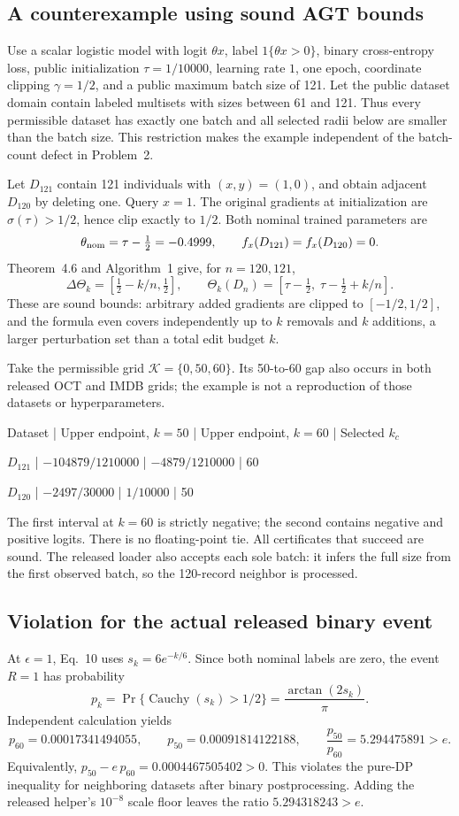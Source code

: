 \documentclass[10pt]{article}
\begin{document}
\subsection*{A counterexample using sound AGT bounds}
Use a scalar logistic model with logit \(\theta x\), label \(1\{\theta x>0\}\), binary cross-entropy loss, public initialization \(\tau=1/10000\), learning rate \(1\), one epoch, coordinate clipping \(\gamma=1/2\), and a public maximum batch size of 121. Let the public dataset domain contain labeled multisets with sizes between 61 and 121. Thus every permissible dataset has exactly one batch and all selected radii below are smaller than the batch size. This restriction makes the example independent of the batch-count defect in Problem 2.\par
Let \(D_{121}\) contain 121 individuals with \((x,y)=(1,0)\), and obtain adjacent \(D_{120}\) by deleting one. Query \(x=1\). The original gradients at initialization are \(\sigma(\tau)>1/2\), hence clip exactly to \(1/2\). Both nominal trained parameters are \[\theta_{\rm nom}=\tau-\tfrac12=-0.4999,\qquad f_x(D_{121})=f_x(D_{120})=0.\] Theorem 4.6 and Algorithm 1 give, for \(n=120,121\), \[\Delta\Theta_k=[\tfrac12-k/n,\tfrac12],
 \qquad
 \Theta_k(D_n)=[\tau-\tfrac12,\;\tau-\tfrac12+k/n].\] These are sound bounds: arbitrary added gradients are clipped to \([-1/2,1/2]\), and the formula even covers independently up to \(k\) removals and \(k\) additions, a larger perturbation set than a total edit budget \(k\).\par
Take the permissible grid \(\mathcal K=\{0,50,60\}\). Its 50-to-60 gap also occurs in both released OCT and IMDB grids; the example is not a reproduction of those datasets or hyperparameters.\par
Dataset | Upper endpoint, \(k=50\) | Upper endpoint, \(k=60\) | Selected \(k_c\)\par
\(D_{121}\) | \(-104879/1210000\) | \(-4879/1210000\) | 60\par
\(D_{120}\) | \(-2497/30000\) | \(1/10000\) | 50\par
The first interval at \(k=60\) is strictly negative; the second contains negative and positive logits. There is no floating-point tie. All certificates that succeed are sound. The released loader also accepts each sole batch: it infers the full size from the first observed batch, so the 120-record neighbor is processed.\par
\subsection*{Violation for the actual released binary event}
At \(\epsilon=1\), Eq. 10 uses \(s_k=6e^{-k/6}\). Since both nominal labels are zero, the event \(R=1\) has probability \[p_k=\Pr\{\operatorname{Cauchy}(s_k)>1/2\}
     =\frac{\arctan(2s_k)}{\pi}.\] Independent calculation yields \[p_{60}=0.00017341494055,\qquad
 p_{50}=0.00091814122188,\qquad
 \frac{p_{50}}{p_{60}}=5.294475891>e.\] Equivalently, \(p_{50}-e\,p_{60}=0.0004467505402>0\). This violates the pure-DP inequality for neighboring datasets after binary postprocessing. Adding the released helper’s \(10^{-8}\) scale floor leaves the ratio \(5.294318243>e\).\par
\end{document}
